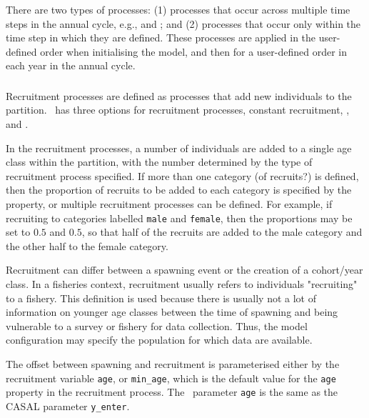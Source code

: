 There are two types of processes: (1) processes that occur across multiple time steps in the annual cycle, e.g.,  and ; and (2) processes that occur only within the time step in which they are defined. These processes are applied in the user-defined order when initialising the model, and then for a user-defined order in each year in the annual cycle.

\subsubsection{}

Recruitment processes are defined as processes that add new individuals to the partition. \CNAME\ has three options for recruitment processes, constant recruitment,  \citep{1203}, and  .

In the recruitment processes, a number of individuals are added to a single age class within the partition, with the number determined by the type of recruitment process specified. If more than one category (of recruits?) is defined, then the proportion of recruits to be added to each category is specified by the  property, or multiple recruitment processes can be defined. For example, if recruiting to categories labelled \texttt{male} and \texttt{female}, then the proportions may be set to $0.5$ and $0.5$, so that half of the recruits are added to the male category and the other half to the female category.

Recruitment can differ between a spawning event or the creation of a cohort/year class. In a fisheries context, recruitment usually refers to individuals "recruiting" to a fishery. This definition is used because there is usually not a lot of information on younger age classes between the time of spawning and being vulnerable to a survey or fishery for data collection. Thus, the model configuration may specify the population for which data are available.

The offset between spawning and recruitment is parameterised either by the recruitment variable \texttt{age}, or \texttt{min\_age}, which is the default value for the \texttt{age} property in the recruitment process. The \CNAME\ parameter \texttt{age} is the same as the CASAL parameter \texttt{y\_enter}.

